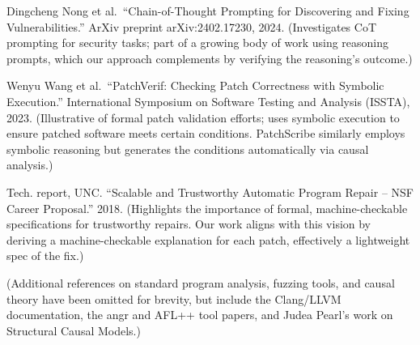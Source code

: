 \documentclass[conference,compsoc]{IEEEtran}
\begin{document}
\begin{thebibliography}{99}
 Dingcheng Nong et al.~``Chain-of-Thought Prompting for Discovering and
Fixing Vulnerabilities.'' ArXiv preprint arXiv:2402.17230, 2024.
(Investigates CoT prompting for security tasks; part of a growing body
of work using reasoning prompts, which our approach complements by
verifying the reasoning's outcome.)

 Wenyu Wang et al.~``PatchVerif: Checking Patch Correctness with Symbolic
Execution.'' International Symposium on Software Testing and Analysis
(ISSTA), 2023. (Illustrative of formal patch validation efforts; uses
symbolic execution to ensure patched software meets certain
conditions. PatchScribe similarly employs symbolic reasoning but
generates the conditions automatically via causal analysis.)

 Tech. report, UNC. ``Scalable and Trustworthy Automatic Program Repair
-- NSF Career Proposal.'' 2018. (Highlights the importance of formal,
machine-checkable specifications for trustworthy repairs. Our work
aligns with this vision by deriving a machine-checkable explanation for
each patch, effectively a lightweight spec of the fix.)

 (Additional references on standard program analysis, fuzzing tools, and
causal theory have been omitted for brevity, but include the Clang/LLVM
documentation, the angr and AFL++ tool papers, and Judea Pearl's work on
Structural Causal Models.)
\end{thebibliography}
\end{document}
